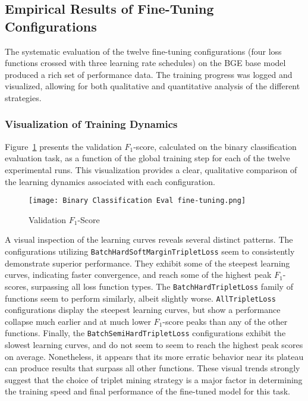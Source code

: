 \subsection{Empirical Results of Fine-Tuning Configurations}
The systematic evaluation of the twelve fine-tuning configurations (four loss functions crossed with three learning rate schedules) on the BGE base model produced a rich set of performance data. The training progress was logged and visualized, allowing for both qualitative and quantitative analysis of the different strategies.

\subsubsection{Visualization of Training Dynamics}
Figure~\ref{fig:binaryf1} presents the validation \(F_1\)-score, calculated on the binary classification evaluation task, as a function of the global training step for each of the twelve experimental runs. This visualization provides a clear, qualitative comparison of the learning dynamics associated with each configuration.
\begin{figure}[tb]
    \captionsetup{skip=5pt}
    \centering
    \texttt{[image: Binary Classification Eval fine-tuning.png]}
    \caption{Validation \(F_1\)-Score}
    \label{fig:binaryf1}
\end{figure}

A visual inspection of the learning curves reveals several distinct patterns. The configurations utilizing \verb|BatchHardSoftMarginTripletLoss| seem to consistently demonstrate superior performance.  They exhibit some of the steepest learning curves, indicating faster convergence, and reach some of the highest peak \(F_1\)-scores, surpassing all loss function types.  The \verb|BatchHardTripletLoss| family of functions seem to perform similarly, albeit slightly worse. \verb|AllTripletLoss| configurations display the steepest learning curves, but show a performance collapse much earlier and at much lower \(F_1\)-score peaks than any of the other functions.  Finally, the \verb|BatchSemiHardTripletLoss| configurations exhibit the slowest learning curves, and do not seem to seem to reach the highest peak scores on average.  Nonetheless, it appears that its more erratic behavior near its plateau can produce results that surpass all other functions.  These visual trends strongly suggest that the choice of triplet mining strategy is a major factor in determining the training speed and final performance of the fine-tuned model for this task.

